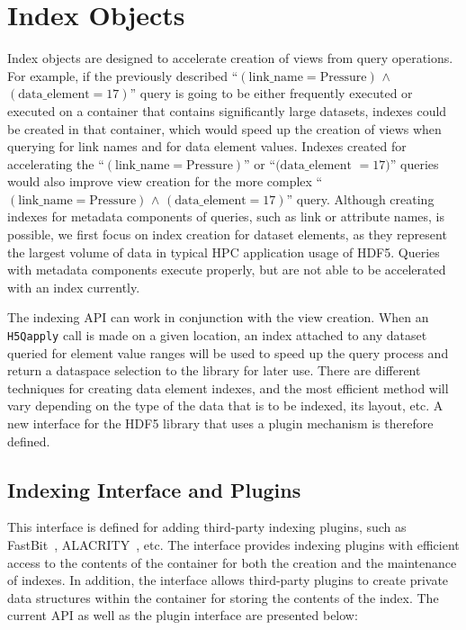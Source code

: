 
\section{Index Objects}
Index objects are designed to accelerate creation of views from query operations.
For example, if the previously described ``$\mathrm{(link\_name = Pressure)}$
$\mathrm{\land}$ $\mathrm{(data\_element = 17)}$'' query
is going to be either frequently executed or executed
on a container that contains significantly large datasets, indexes
could be created in that container, which would speed up the
creation of views when querying for link names and for data element values.
Indexes created for accelerating the  ``$\mathrm{(link\_name = Pressure)}$'' or
``$\mathrm{(data\_element}$ $\mathrm{= 17)}$'' queries
would also improve view creation for the more complex
``$\mathrm{(link\_name = Pressure)}$ $\mathrm{\land}$
$\mathrm{(data\_element = 17)}$'' query.
Although creating indexes for metadata components of queries, such as link or
attribute names, is possible, we first focus on index creation for dataset elements,
as they represent the largest volume of data in typical HPC application usage of
HDF5. Queries with metadata components execute properly,
but are not able to be accelerated with an index currently.

The indexing API can work in conjunction with the view creation. When an \texttt{H5Qapply}
call is made on a given location, an index attached to any dataset queried
for element value ranges will be used to speed up the query process and return
a dataspace selection to the library for later use.
There are different techniques for creating data element indexes, and the most
efficient method will vary depending on the type of the data that is to be
indexed, its layout, etc. A new interface for the HDF5 library that uses a
plugin mechanism is therefore defined.

\subsection{Indexing Interface and Plugins}

This interface is defined for adding third-party indexing plugins,
such as FastBit~\cite{Wu05}, ALACRITY~\cite{alacrity13}, etc.
The interface provides indexing plugins with efficient access to the contents of
the container for both the creation and the maintenance of indexes. In addition,
the interface allows third-party plugins to create private data structures
within the container for storing the contents of the index.
The current API as well as the plugin interface are presented below:

